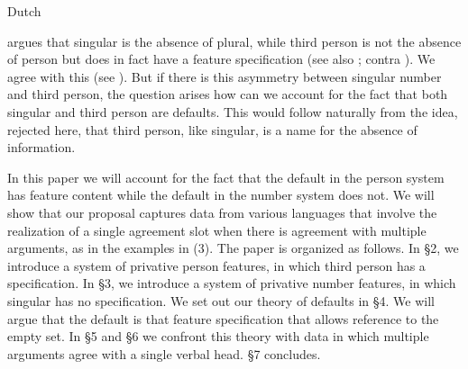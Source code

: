 \documentclass[output=paper]{langsci/langscibook}
\begin{document}
\ea \label{bkm:Ref328731088}\label{bkm:Ref294426209}  Dutch
\z 
\z

\citet{Nevins2007,Nevins2011} argues that singular is the absence of plural, while third person is not the absence of person but does in fact have a feature specification (see also \citealt{Kerstens1993,Halle1997}; contra \citealt{Forchheimer1953,Kayne1993,Harley2002Person,Bejar2003,Cysouw2003,Anagnostopoulou2005Strong,Adger2007}). We agree with this (see \citealt{Ackema2013,Ackema2018}). But if there is this asymmetry between singular number and third person, the question arises how can we account for the fact that both singular and third person are defaults. This would follow naturally from the idea, rejected here, that third person, like singular, is a name for the absence of information.

In this paper we will account for the fact that the default in the person system has feature content while the default in the number system does not. We will show that our proposal captures data from various languages that involve the realization of a single agreement slot when there is agreement with multiple arguments, as in the examples in (3). The paper is organized as follows. In §2, we introduce a system of privative person features, in which third person has a specification. In §3, we introduce a system of privative number features, in which singular has no specification. We set out our theory of defaults in §4. We will argue that the default is that feature specification that allows reference to the empty set. In §5 and §6 we confront this theory with data in which multiple arguments agree with a single verbal head. §7 concludes.
\end{document}

